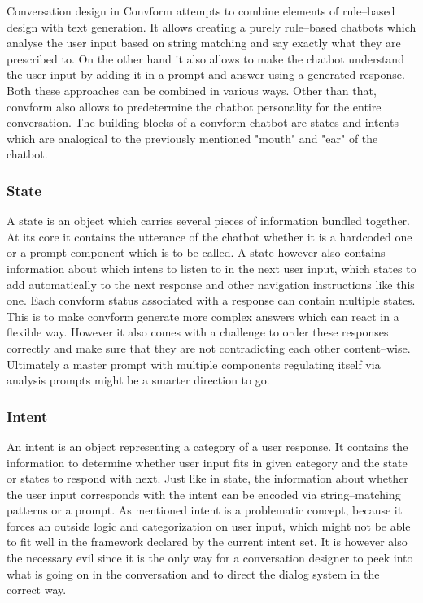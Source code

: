 \documentclass[12pt]{report}
\begin{document}
{\par
Conversation design in Convform attempts
to combine elements of rule–based design with text generation.
It allows creating a purely rule–based chatbots
which analyse the user input based on string matching
and say exactly what they are prescribed to.
On the other hand it also allows to make the chatbot
understand the user input by adding it in a prompt
and answer using a generated response.
Both these approaches can be combined in various ways.
Other than that, convform also allows to predetermine
the chatbot personality for the entire conversation.
The building blocks of a convform chatbot are
states and intents which are
analogical to the previously mentioned "mouth" and "ear"
of the chatbot.

\subsubsection{State}
A state is an object which carries several pieces of information
bundled together.
At its core it contains the utterance of the chatbot
whether it is a hardcoded one or a prompt component which is to be called.
A state however also contains information about
which intens to listen to in the next user input,
which states to add automatically to the next response
and other navigation instructions like this one.
Each convform status associated with a response
can contain multiple states.
This is to make convform generate more complex answers
which can react in a flexible way.
However it also comes with a challenge to order these responses correctly
and make sure that they are not contradicting each other content–wise.
Ultimately a master prompt with multiple components
regulating itself via analysis prompts
might be a smarter direction to go.

\subsubsection{Intent}
An intent is an object representing a category of a user response.
It contains the information to determine whether
user input fits in given category and
the state or states to respond with next.
Just like in state, the information about whether the user input
corresponds with the intent can be encoded via
string–matching patterns or a prompt.
As mentioned intent is a problematic concept,
because it forces an outside logic and categorization
on user input, which might not be able to fit well
in the framework declared by the current intent set.
It is however also the necessary evil since
it is the only way for a conversation designer
to peek into what is going on in the conversation
and to direct the dialog system in the correct way.

}
\end{document}
